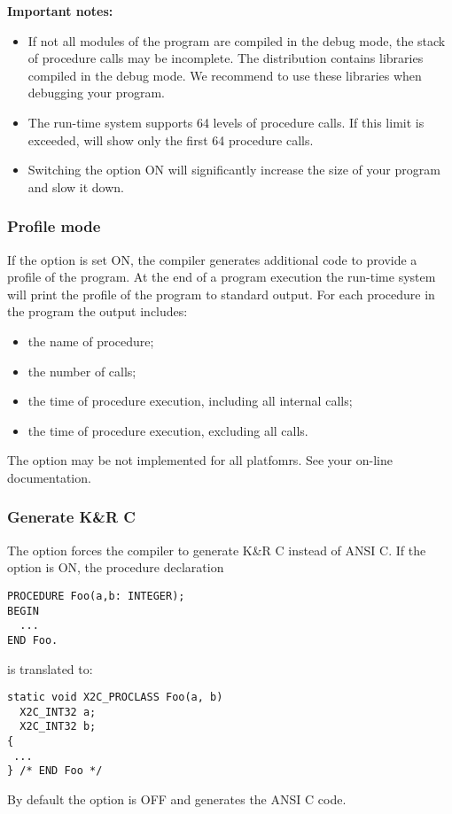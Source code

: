 {\bf Important notes:}
\begin{itemize}
\item
        If not all modules of the program are compiled in the
        debug mode, the stack of procedure calls may be
        incomplete. The \xds{} distribution contains libraries
        compiled in the debug mode. We recommend to use
        these libraries when debugging your program.

\item
        The \xds{} run-time system supports 64 levels of procedure
        calls. If this limit is exceeded, \xds{} will show only the first
        64 procedure calls.

\item
        Switching the option ON will significantly increase
        the size of your program and slow it down.
\end{itemize}

\subsubsection{Profile mode}

If the option  is
set ON, the compiler generates additional code to provide a profile of
the program. At the end of a program execution the run-time system will
print the profile of the program to standard output. For each procedure
in the program the output includes:
\begin{itemize}
\item  the name of procedure;
\item  the number of calls;
\item  the time of procedure execution, including all internal calls;
\item  the time of procedure execution, excluding all calls.
\end{itemize}

The option may be not implemented for all platfomrs.
See your on-line documentation.

\subsubsection{Generate K\&R C}

The option 
forces the compiler to generate K\&R C instead of ANSI C.
If the option is ON, the procedure declaration
\begin{verbatim}
PROCEDURE Foo(a,b: INTEGER);
BEGIN
  ...
END Foo.
\end{verbatim}
is translated to:
\begin{verbatim}
static void X2C_PROCLASS Foo(a, b)
  X2C_INT32 a;
  X2C_INT32 b;
{
 ...
} /* END Foo */
\end{verbatim}
By default the option is OFF and \xds{} generates the ANSI C code.

